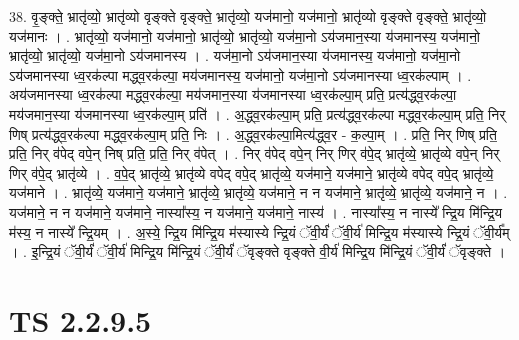 \documentclass[17pt]{extarticle}
\begin{document}
38. वृ॒ङ्क्ते॒ भ्रातृ॑व्यो॒ भ्रातृ॑व्यो वृङ्क्ते वृङ्क्ते॒ भ्रातृ॑व्यो॒ यज॑मानो॒ यज॑मानो॒ भ्रातृ॑व्यो वृङ्क्ते वृङ्क्ते॒ भ्रातृ॑व्यो॒ यज॑मानः । . भ्रातृ॑व्यो॒ यज॑मानो॒ यज॑मानो॒ भ्रातृ॑व्यो॒ भ्रातृ॑व्यो॒ यज॑मा॒नो ऽय॑जमान॒स्या य॑जमानस्य॒ यज॑मानो॒ भ्रातृ॑व्यो॒ भ्रातृ॑व्यो॒ यज॑मा॒नो ऽय॑जमानस्य । . यज॑मा॒नो ऽय॑जमान॒स्या य॑जमानस्य॒ यज॑मानो॒ यज॑मा॒नो ऽय॑जमानस्या ध्व॒रक॑ल्पा मद्ध्व॒रक॑ल्पा॒ मय॑जमानस्य॒ यज॑मानो॒ यज॑मा॒नो ऽय॑जमानस्या ध्व॒रक॑ल्पाम् । . अय॑जमानस्या ध्व॒रक॑ल्पा मद्ध्व॒रक॑ल्पा॒ मय॑जमान॒स्या य॑जमानस्या ध्व॒रक॑ल्पा॒म् प्रति॒ प्रत्य॑द्ध्व॒रक॑ल्पा॒ मय॑जमान॒स्या य॑जमानस्या ध्व॒रक॑ल्पा॒म् प्रति॑ । . अ॒द्ध्व॒रक॑ल्पा॒म् प्रति॒ प्रत्य॑द्ध्व॒रक॑ल्पा मद्ध्व॒रक॑ल्पा॒म् प्रति॒ निर् णिष् प्रत्य॑द्ध्व॒रक॑ल्पा मद्ध्व॒रक॑ल्पा॒म् प्रति॒ निः । . अ॒द्ध्व॒रक॑ल्पा॒मित्य॑द्ध्व॒र - क॒ल्पा॒म् । . प्रति॒ निर् णिष् प्रति॒ प्रति॒ निर् व॑पेद् वपे॒न् निष् प्रति॒ प्रति॒ निर् व॑पेत् । . निर् व॑पेद् वपे॒न् निर् णिर् व॑पे॒द् भ्रातृ॑व्ये॒ भ्रातृ॑व्ये वपे॒न् निर् णिर् व॑पे॒द् भ्रातृ॑व्ये । . व॒पे॒द् भ्रातृ॑व्ये॒ भ्रातृ॑व्ये वपेद् वपे॒द् भ्रातृ॑व्ये॒ यज॑माने॒ यज॑माने॒ भ्रातृ॑व्ये वपेद् वपे॒द् भ्रातृ॑व्ये॒ यज॑माने । . भ्रातृ॑व्ये॒ यज॑माने॒ यज॑माने॒ भ्रातृ॑व्ये॒ भ्रातृ॑व्ये॒ यज॑माने॒ न न यज॑माने॒ भ्रातृ॑व्ये॒ भ्रातृ॑व्ये॒ यज॑माने॒ न । . यज॑माने॒ न न यज॑माने॒ यज॑माने॒ नास्या᳚स्य॒ न यज॑माने॒ यज॑माने॒ नास्य॑ । . नास्या᳚स्य॒ न नास्ये᳚ न्द्रि॒य मि॑न्द्रि॒य म॑स्य॒ न नास्ये᳚ न्द्रि॒यम् । . अ॒स्ये॒ न्द्रि॒य मि॑न्द्रि॒य म॑स्यास्ये न्द्रि॒यं ॅवी॒र्यं॑ ॅवी॒र्य॑ मिन्द्रि॒य म॑स्यास्ये न्द्रि॒यं ॅवी॒र्य᳚म् । . इ॒न्द्रि॒यं ॅवी॒र्यं॑ ॅवी॒र्य॑ मिन्द्रि॒य मि॑न्द्रि॒यं ॅवी॒र्यं॑ ॅवृङ्क्ते वृङ्क्ते वी॒र्य॑ मिन्द्रि॒य मि॑न्द्रि॒यं ॅवी॒र्यं॑ ॅवृङ्क्ते । \newline
\pagebreak
{}

\section{ TS 2.2.9.5 }
\end{document}
